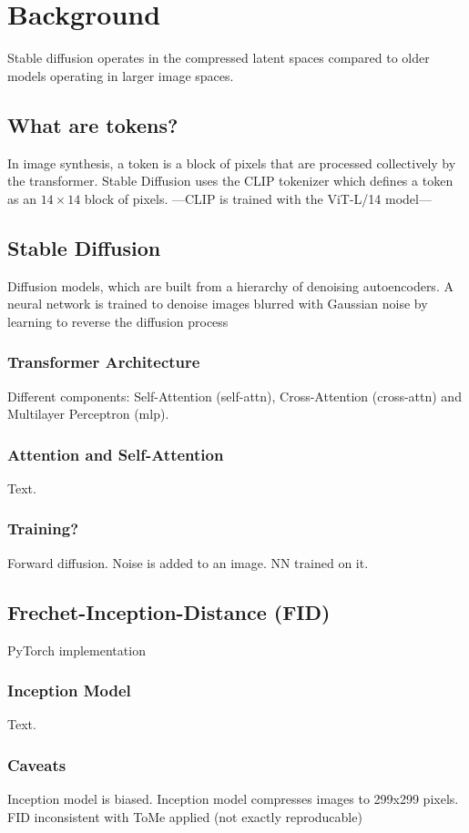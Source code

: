 \section{Background}
Stable diffusion operates in the compressed latent spaces compared to older models operating in larger image spaces.

\subsection{What are tokens?}
In image synthesis, a token is a block of pixels that are processed collectively by the transformer. Stable Diffusion uses the CLIP tokenizer\cite{radford2021learning} which defines a token as an $14 \times 14$ block of pixels. ---CLIP is trained with the ViT-L/14 model---

\subsection{Stable Diffusion}
Diffusion models, which are built from a hierarchy of
denoising autoencoders. A neural network is trained to denoise images blurred with Gaussian noise by learning to reverse the diffusion process

\subsubsection{Transformer Architecture}
Different components: Self-Attention (self-attn), Cross-Attention (cross-attn) and Multilayer Perceptron (mlp).

\subsubsection{Attention and Self-Attention}
Text.

\subsubsection{Training?}
Forward diffusion. Noise is added to an image. NN trained on it.

\subsection{Frechet-Inception-Distance (FID)}
PyTorch implementation\cite{Seitzer2020FID}

\subsubsection{Inception Model}
Text.

\subsubsection{Caveats}
Inception model is biased. Inception model compresses images to 299x299 pixels. FID inconsistent with ToMe applied (not exactly reproducable)